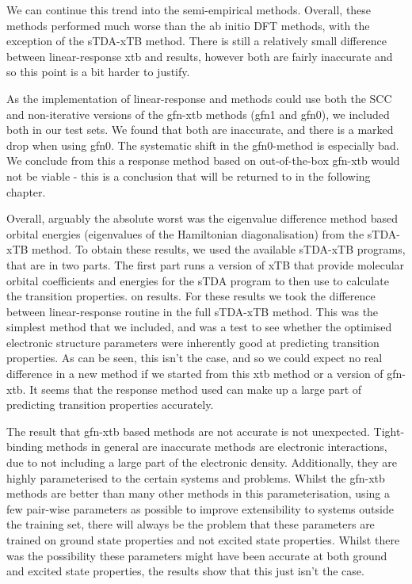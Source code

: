 We can continue this trend into the semi-empirical methods. Overall, these methods
performed much worse than the ab initio DFT methods, with the exception of the
sTDA-xTB method. There is still a relatively small difference between linear-response
xtb and \dxtb results, however both are fairly inaccurate and so this point is a
bit harder to justify. 

As the implementation of linear-response and \dxtb methods could use both the
SCC and non-iterative versions of the gfn-xtb methods (gfn1 and gfn0), we included
both in our test sets. We found that both are inaccurate, and there is a marked
drop when using gfn0. The systematic shift in the gfn0-\dxtb method is especially
bad. We conclude from this a response method based on out-of-the-box gfn-xtb would
not be viable - this is a conclusion that will be returned to in the following
chapter.

Overall, arguably the absolute worst was the eigenvalue difference method based
orbital energies (eigenvalues of the Hamiltonian diagonalisation) from the sTDA-xTB
method. To obtain these results, we used the available sTDA-xTB programs, that are
in two parts. The first part runs a version of xTB that provide molecular orbital
coefficients and energies for the sTDA program to then use to calculate the transition
properties.
on  results. For these results we took the difference between
linear-response routine in the full sTDA-xTB method. This was the simplest method
that we included, and was a test to see whether the optimised electronic structure 
parameters were inherently good at predicting transition properties. As can be 
seen, this isn't the case, and so we could expect no real difference in a new
method if we started from this xtb method or a version of gfn-xtb. It seems that
the response method used can make up a large part of predicting transition properties
accurately.

The result that gfn-xtb based methods are not accurate is not unexpected. Tight-binding
methods in general are inaccurate methods are electronic interactions, due to not
including a large part of the electronic density. Additionally, they are highly
parameterised to the certain systems and problems. Whilst the gfn-xtb methods are
better than many other methods in this parameterisation, using a few pair-wise
parameters as possible to improve extensibility to systems outside the training
set, there will always be the problem that these parameters are trained on ground
state properties and not excited state properties. Whilst there was the possibility 
these parameters might have been accurate at both ground and excited state properties,
the results show that this just isn't the case.

